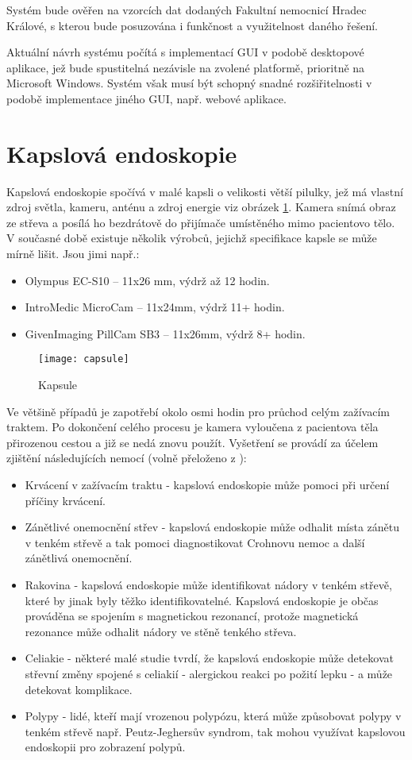 Systém bude ověřen na vzorcích dat dodaných Fakultní nemocnicí Hradec Králové, s kterou bude posuzována i funkčnost a využitelnost daného řešení.

Aktuální návrh systému počítá s implementací GUI v podobě desktopové aplikace, jež bude spustitelná nezávisle na zvolené platformě, prioritně na Microsoft Windows. Systém však musí být schopný snadné rozšiřitelnosti v podobě implementace jiného GUI, např. webové aplikace.
\section{Kapslová endoskopie}
Kapslová endoskopie spočívá v malé kapsli o velikosti větší pilulky, jež má vlastní zdroj světla, kameru, anténu a zdroj energie viz obrázek \ref{fig:capsule}. Kamera snímá obraz ze střeva a posílá ho bezdrátově do přijímače umístěného mimo pacientovo tělo. V současné době existuje několik výrobců, jejichž specifikace kapsle se může mírně lišit. Jsou jimi např.:
\begin{itemize}
	\item Olympus EC-S10 – 11x26 mm, výdrž až 12 hodin.\cite{endocapsule}
	\item IntroMedic MicroCam – 11x24mm, výdrž 11+ hodin.\cite{intromedic}
	\item GivenImaging PillCam SB3 – 11x26mm, výdrž 8+ hodin.\cite{pillcam}
\end{itemize}

\begin{figure}[h]
	\texttt{[image: capsule]}
	\centering
	\caption{Kapsule \cite{capsule}\label{fig:capsule}}
\end{figure}

Ve většině případů je zapotřebí okolo osmi hodin \cite{diagnosing} pro průchod celým zažívacím traktem. Po dokončení celého procesu je kamera vyloučena z pacientova těla přirozenou cestou a již se nedá znovu použít. Vyšetření se provádí za účelem zjištění následujících nemocí (volně přeloženo z \cite{capsule}):

\begin{itemize}
\item Krvácení v zažívacím traktu - kapslová endoskopie může pomoci při určení příčiny krvácení.
\item Zánětlivé onemocnění střev - kapslová endoskopie může odhalit místa zánětu v tenkém střevě a tak pomoci diagnostikovat Crohnovu nemoc a další zánětlivá onemocnění.
\item Rakovina - kapslová endoskopie může identifikovat nádory v tenkém střevě, které by jinak byly těžko identifikovatelné. Kapslová endoskopie je občas prováděna se spojením s magnetickou rezonancí, protože magnetická rezonance může odhalit nádory ve stěně tenkého střeva.
\item Celiakie - některé malé studie tvrdí, že kapslová endoskopie může detekovat střevní změny spojené s celiakií - alergickou reakci po požití lepku - a může detekovat komplikace.
\item Polypy - lidé, kteří mají vrozenou polypózu, která může způsobovat polypy v tenkém střevě např. Peutz-Jeghersův syndrom, tak mohou využívat kapslovou endoskopii pro zobrazení polypů.
\end{itemize}

